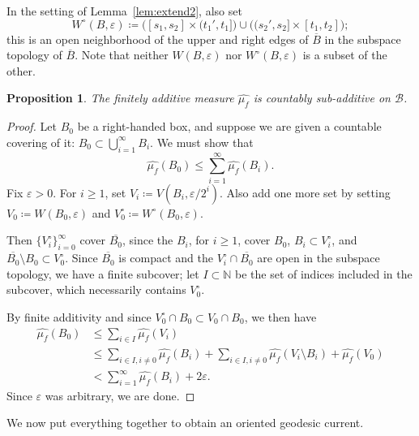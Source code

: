 \documentclass[11pt]{amsart}
\numberwithin{equation}{section}
\numberwithin{figure}{section}
\newtheorem{proposition}[theorem]{Proposition}
\theoremstyle{definition}
\theoremstyle{plain}
\newcommand\cB{\ensuremath{\mathcal{B}}}
\newcommand*{\wh}[1]{\widehat{#1}}
\renewcommand{\epsilon}{\varepsilon}
\begin{document}
In the setting of Lemma~\ref{lem:extend2}, also set
\[
  W^\circ(B,\epsilon) \coloneqq \bigl([s_1,s_2] \times (t_1',t_1]\bigr) \cup
    \bigl((s_2',s_2] \times [t_1,t_2]\bigr);
\]
this is an open neighborhood of the upper and right edges of
$\overline{B}$ in the subspace topology of $\overline{B}$. Note that
neither $W(B,\epsilon)$ nor $W^\circ(B,\epsilon)$ is a subset of the
other.

\begin{proposition}\label{prop:countablyadditive}
  The finitely additive measure $\wh{\mu_f}$ is countably sub-additive on $\cB$.
\end{proposition}

\begin{proof}
  Let $B_0$ be a right-handed box, and suppose we are given a
  countable covering of it: $B_0 \subset \bigcup_{i=1}^\infty B_i$. We
  must show that
  \[
    \wh{\mu_f}(B_0) \le \sum_{i=1}^\infty \wh{\mu_f}(B_i).
  \]
  Fix $\epsilon > 0$. For $i \ge 1$, set
  $V_i \coloneqq V(B_i, \epsilon/2^i)$. Also add one more set by setting
  $V_0 \coloneqq W(B_0,\epsilon)$ and $V_0^\circ \coloneqq W^\circ(B_0,\epsilon)$.

  Then $\{V_i^\circ\}_{i=0}^\infty$ cover $\overline{B_0}$, since
  the $B_i$, for $i \geq 1$, cover $B_0$, $B_i \subset V_i^\circ$, and
  $\overline{B_0}\setminus B_0 \subset V_0^\circ$. Since
  $\overline{B_0}$ is compact and the $V_i^\circ \cap \overline{B_0}$ are open in the
  subspace topology, we have a finite subcover; let $I \subset
  \mathbb{N}$ be the set of
  indices included in the subcover, which necessarily contains $V_0^\circ$.

  By finite additivity and since $V_0^\circ \cap B_0 \subset V_0 \cap B_0$, we then have
  \begin{align*}
    \wh{\mu_f}(B_0) &\le \sum_{i \in I} \wh{\mu_f}(V_i)\\
      &\le \sum_{i \in I, i \ne 0} \wh{\mu_f}(B_i) + \sum_{i \in I, i \ne 0}
        \wh{\mu_f}(V_i \setminus B_i) + \wh{\mu_f}(V_0)\\
      &< \sum_{i=1}^\infty \wh{\mu_f}(B_i) + 2\epsilon.
  \end{align*}
  Since $\epsilon$ was arbitrary, we are done.
\end{proof}

We now put everything together to obtain an oriented geodesic current.
\end{document}
